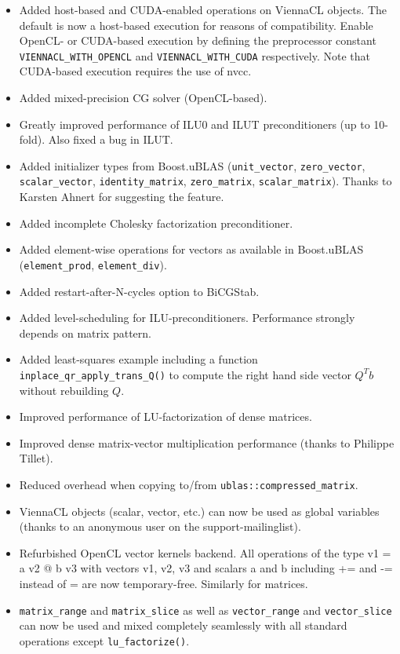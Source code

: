 \begin{itemize}
 \item Added host-based and CUDA-enabled operations on ViennaCL objects. The default is now a host-based execution for reasons of compatibility.
       Enable OpenCL- or CUDA-based execution by defining the preprocessor constant \lstinline|VIENNACL_WITH_OPENCL| and \lstinline|VIENNACL_WITH_CUDA| respectively.
       Note that CUDA-based execution requires the use of nvcc.
 \item Added mixed-precision CG solver (OpenCL-based).
 \item Greatly improved performance of ILU0 and ILUT preconditioners (up to 10-fold). Also fixed a bug in ILUT.
 \item Added initializer types from Boost.uBLAS (\lstinline|unit_vector|, \lstinline|zero_vector|, \lstinline|scalar_vector|, \lstinline|identity_matrix|, \lstinline|zero_matrix|, \lstinline|scalar_matrix|).
       Thanks to Karsten Ahnert for suggesting the feature.
 \item Added incomplete Cholesky factorization preconditioner.
 \item Added element-wise operations for vectors as available in Boost.uBLAS (\lstinline|element_prod|, \lstinline|element_div|).
 \item Added restart-after-N-cycles option to BiCGStab.
 \item Added level-scheduling for ILU-preconditioners. Performance strongly depends on matrix pattern.
 \item Added least-squares example including a function \lstinline|inplace_qr_apply_trans_Q()| to compute the right hand side vector $Q^T b$ without rebuilding $Q$.
 \item Improved performance of LU-factorization of dense matrices.
 \item Improved dense matrix-vector multiplication performance (thanks to Philippe Tillet).
 \item Reduced overhead when copying to/from \lstinline|ublas::compressed_matrix|.
 \item ViennaCL objects (scalar, vector, etc.) can now be used as global variables (thanks to an anonymous user on the support-mailinglist).
 \item Refurbished OpenCL vector kernels backend. 
       All operations of the type v1 = a v2 @ b v3 with vectors v1, v2, v3 and scalars a and b including += and -= instead of = are now temporary-free. Similarly for matrices.
 \item \lstinline|matrix_range| and \lstinline|matrix_slice| as well as \lstinline|vector_range| and \lstinline|vector_slice| can now be used and mixed completely seamlessly with all standard operations except \lstinline|lu_factorize()|.

\end{itemize}
